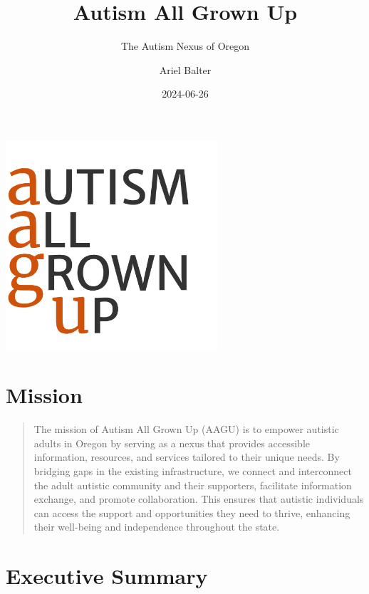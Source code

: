\documentclass[
  letterpaper,
  DIV=11,
  numbers=noendperiod]{scrreprt}
\title{Autism All Grown Up}
\subtitle{The Autism Nexus of Oregon}
\author{Ariel Balter}
\date{2024-06-26}
\renewcommand*\contentsname{Table of contents}
\newcommand\contentsname{Table of contents}
\begin{document}
\maketitle

\renewcommand*\contentsname{Contents}
{
\hypersetup{linkcolor=}
\setcounter{tocdepth}{1}
\tableofcontents
}

\chapter{}\label{section}

\includegraphics[width=3.09896in,height=3.05923in]{./media/image4.png}


\chapter{Mission}\label{sec-mission}

\begin{quote}
The mission of Autism All Grown Up (AAGU) is to empower autistic adults
in Oregon by serving as a nexus that provides accessible information,
resources, and services tailored to their unique needs. By bridging gaps
in the existing infrastructure, we connect and interconnect the adult
autistic community and their supporters, facilitate information
exchange, and promote collaboration. This ensures that autistic
individuals can access the support and opportunities they need to
thrive, enhancing their well-being and independence throughout the
state.
\end{quote}


\chapter{Executive Summary}\label{sec-executive_summary}
\end{document}
